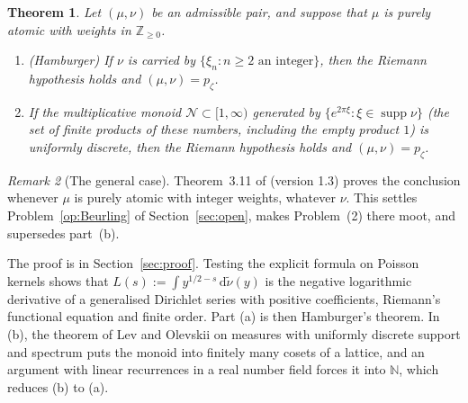 \documentclass[11pt]{amsart}
\newcommand{\ZZ}{\mathbb Z}
\newcommand{\NN}{\mathbb N}
\newcommand{\dd}{\,\mathrm d}
\newcommand{\supp}{\operatorname{supp}}
\newcommand{\xin}[1]{\xi_{#1}}
\newcommand{\pz}{p_\zeta}
\newtheorem{theorem}{Theorem}[section]
\theoremstyle{definition}
\theoremstyle{remark}
\newtheorem{remark}[theorem]{Remark}
\numberwithin{equation}{section}
\begin{document}
\begin{theorem}\label{thm:integer}
Let $(\mu,\nu)$ be an admissible pair, and suppose that $\mu$ is purely atomic with weights in $\ZZ_{\ge0}$.
\begin{enumerate}[label=\textup{(\alph*)}]
\item \textup{(Hamburger)} If $\nu$ is carried by $\{\xin n:n\ge2\text{ an integer}\}$, then the Riemann hypothesis holds and
$(\mu,\nu)=\pz$.
\item If the multiplicative monoid $\mathcal N\subset[1,\infty)$ generated by $\{e^{2\pi\xi}:\xi\in\supp\nu\}$ \textup{(}the set of finite
products of these numbers, including the empty product $1$\textup{)} is uniformly
discrete, then the Riemann hypothesis holds and $(\mu,\nu)=\pz$.
\end{enumerate}
\end{theorem}

\begin{remark}[The general case]\label{rem:general}
Theorem~3.11 of \cite{PaperI} (version 1.3) proves the conclusion whenever $\mu$ is purely atomic with integer weights, whatever $\nu$. This settles
Problem~\ref{op:Beurling} of Section~\ref{sec:open}, makes Problem~(2) there moot, and supersedes part~(b).
\end{remark}

The proof is in Section~\ref{sec:proof}. Testing the explicit formula on Poisson kernels shows that
$L(s):=\int y^{1/2-s}\dd\tilde\nu(y)$ is the negative logarithmic derivative of a generalised Dirichlet series with positive
coefficients, Riemann's functional equation and finite order. Part (a) is then Hamburger's theorem. In (b), the theorem of
Lev and Olevskii on measures with uniformly discrete support and spectrum puts the monoid into finitely many cosets of
a lattice, and an argument with linear recurrences in a real number field forces it into $\NN$, which reduces (b) to (a).
\end{document}
